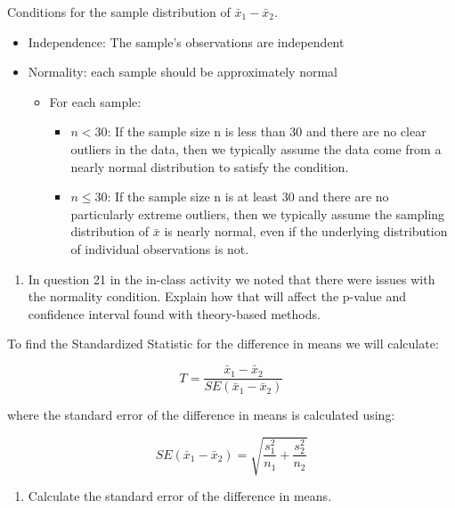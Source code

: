 \documentclass[
]{report}
\providecommand{\tightlist}{%
  \setlength{\itemsep}{0pt}\setlength{\parskip}{0pt}}
\begin{document}
Conditions for the sample distribution of \(\bar{x}_1-\bar{x}_2\).

\begin{itemize}
\item
  Independence: The sample's observations are independent
\item
  Normality: each sample should be approximately normal

  \begin{itemize}
  \item
    For each sample:

    \begin{itemize}
    \item
      \(n < 30\): If the sample size n is less than 30 and there are no clear outliers in the data, then we typically assume the data come from a nearly normal distribution to satisfy the condition.
    \item
      \(n \le 30\): If the sample size n is at least 30 and there are no particularly extreme outliers, then we typically assume the sampling distribution of \(\bar{x}\) is nearly normal, even if the underlying distribution of individual observations is not.
    \end{itemize}
  \end{itemize}
\end{itemize}

\begin{enumerate}
\def\labelenumi{\arabic{enumi}.}
\tightlist
\item
  In question 21 in the in-class activity we noted that there were issues with the normality condition. Explain how that will affect the p-value and confidence interval found with theory-based methods.
\end{enumerate}

\vspace{1in}

To find the Standardized Statistic for the difference in means we will calculate:

\[T = \frac{\bar{x}_1-\bar{x}_2}{SE(\bar{x}_1-\bar{x}_2)}\]

where the standard error of the difference in means is calculated using:

\[SE(\bar{x}_1 -\bar{x}_2)=\sqrt{\frac{s_1^2}{n_1}+\frac{s_2^2}{n_2}}\]
\newpage

\begin{enumerate}
\def\labelenumi{\arabic{enumi}.}
\setcounter{enumi}{1}
\tightlist
\item
  Calculate the standard error of the difference in means.
\end{enumerate}
\end{document}
